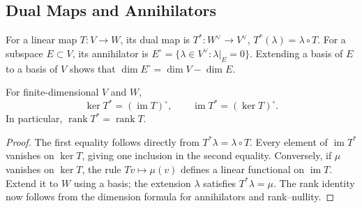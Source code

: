 \subsection{Dual Maps and Annihilators}
For a linear map $T:V\to W$, its dual map is
$T^*:W^\vee\to V^\vee$, $T^*(\lambda)=\lambda\circ T$.
For a subspace $E\subset V$, its annihilator is
$E^\circ=\{\lambda\in V^\vee:\lambda|_E=0\}$.
Extending a basis of $E$ to a basis of $V$ shows that
$\dim E^\circ=\dim V-\dim E$.

\begin{proposition}
For finite-dimensional $V$ and $W$,
\[
 \ker T^*=(\operatorname{im}T)^\circ,\qquad
 \operatorname{im}T^*=(\ker T)^\circ.
\]
In particular, $\operatorname{rank}T^*=\operatorname{rank}T$.
\end{proposition}
\begin{proof}
The first equality follows directly from $T^*\lambda=\lambda\circ T$.
Every element of $\operatorname{im}T^*$ vanishes on $\ker T$, giving one
inclusion in the second equality. Conversely, if $\mu$ vanishes on
$\ker T$, the rule $Tv\mapsto\mu(v)$ defines a linear functional on
$\operatorname{im}T$. Extend it to $W$ using a basis; the extension $\lambda$
satisfies $T^*\lambda=\mu$. The rank identity now follows from the
dimension formula for annihilators and rank--nullity.
\end{proof}
